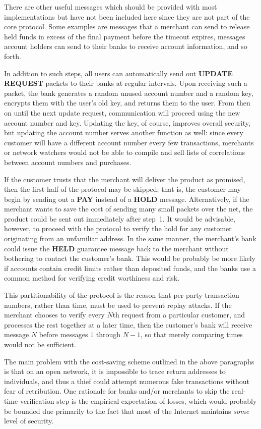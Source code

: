 There are other useful messages which should be provided with most
implementations but have not been included here since they are not part of
the core protocol.  Some examples are messages that a merchant can send to
release held funds in excess of the final payment before the timeout
expires, messages account holders can send to their banks to receive
account information, and so forth.

In addition to such steps, all users can automatically send out {\bf
UPDATE REQUEST} packets to their banks at regular intervals.  Upon
receiving such a packet, the bank generates a random unused account
number and a random key, encrypts them with the user's old key, and
returns them to the user.  From then on until the next update request,
communication will proceed using the new account number and key.
Updating the key, of course, improves overall security, but updating
the account number serves another function as well: since every
customer will have a different account number every few transactions,
merchants or network watchers would not be able to compile and sell
lists of correlations between account numbers and purchases.

If the customer trusts that the merchant will deliver the product as
promised, then the first half of the protocol may be skipped; that is,
the customer may begin by sending out a {\bf PAY} instead of a {\bf HOLD}
message.  Alternatively,
if the merchant wants to save the cost of sending many small packets over
the net, the product could be sent out immediately after \mbox{step 1}.  It would
be advisable, however, to proceed with the protocol to verify the hold for
any customer originating from an unfamiliar address.  In the same manner,
the merchant's bank could issue the {\bf HELD} guarantee message back to the
merchant without bothering to contact the customer's bank.  This would be
probably be more likely if accounts contain credit limits rather than deposited
funds, and the banks use a common method for verifying credit worthiness and
risk.

This partitionability of the protocol is the reason that per-party
transaction numbers, rather than time, must be used to prevent replay
attacks.  If the merchant chooses to verify every $N$th request from a
particular customer, and processes the rest together at a later time, then
the customer's bank will receive message $N$ before messages $1$ through
$N-1$, so that merely comparing times would not be sufficient.

The main problem with the cost-saving scheme outlined in the above
paragraphs is that on an open network, it is impossible to trace return
addresses to individuals, and thus a thief could attempt numerous fake
transactions without fear of retribution.  One rationale for banks
and/or merchants to skip the real-time verification step is the empirical
expectation of losses, which would probably be bounded due primarily to the
fact that most of the Internet maintains {\em some} level of security.

